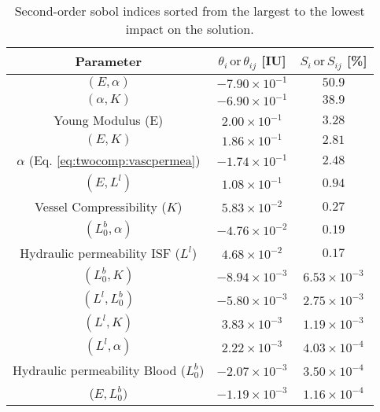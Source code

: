 \begin{table}[ht!]
\centering
{%
\begin{tabular}{ccc}
\hline
Parameter                          & $\theta_i\, \text{or}\,\theta_{ij}$ [IU] & $S_i\,\text{or}\,S_{ij}$ [\%] \\ \hline
$(E , \alpha)$                 & $-7.90\times10^{-1}$            & $50.9$               \\
$(\alpha , K)$                 & $-6.90\times10^{-1}$            & $38.9$              \\ 
Young Modulus (E)                  & $2.00\times10^{-1}$             & $3.28$               \\
$(E , K)$                      & $1.86\times10^{-1}$             & $2.81$               \\
$\alpha$ (Eq. \ref{eq:twocomp:vascpermea})     & $-1.74\times10^{-1}$            & $2.48$               \\
$(E , L^l)$                    & $1.08\times10^{-1}$             & $0.94$               \\
Vessel Compressibility ($K$)         & $5.83\times10^{-2}$             & $0.27$               \\
$(L^b_0 , \alpha)$               & $-4.76\times10^{-2}$            & $0.19$               \\
Hydraulic permeability ISF ($L^l$) & $4.68\times10^{-2}$             & $0.17$               \\
$(L^b_0 , K)$                    & $-8.94\times10^{-3}$            & $6.53\times10^{-3}$  \\
$(L^l , L^b_0)$                  & $-5.80\times10^{-3}$            & $2.75\times10^{-3}$  \\
$(L^l , K)$                    & $3.83\times10^{-3}$             & $1.19\times10^{-3}$  \\
$(L^l , \alpha)$               & $2.22\times10^{-3}$             & $4.03\times10^{-4}$  \\
Hydraulic permeability Blood ($L^b_0$) & $-2.07\times10^{-3}$            & $3.50\times10^{-4}$  \\
($E , L^b_0)$                    & $-1.19\times10^{-3}$            & $1.16\times10^{-4}$  \\ \hline
\end{tabular}%
}
\caption{Second-order sobol indices sorted from the largest to the lowest impact on the solution.}
\label{tab:sobol}
\end{table}